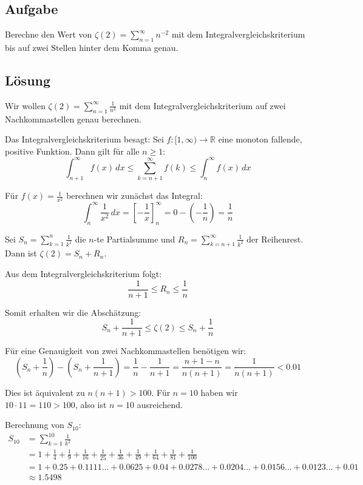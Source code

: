 \documentclass{article}
\begin{document}
\subsection*{Aufgabe}
Berechne den Wert von $\zeta(2)=\sum_{n=1}^\infty n^{-2}$ mit dem
Integralvergleichskriterium bis auf zwei Stellen hinter dem Komma genau.

\subsection*{Lösung}

Wir wollen $\zeta(2) = \sum_{n=1}^{\infty} \frac{1}{n^2}$ mit dem Integralvergleichskriterium auf zwei Nachkommastellen genau berechnen.

Das Integralvergleichskriterium besagt: Sei $f: [1,\infty) \to \mathbb{R}$ eine monoton fallende, positive Funktion. Dann gilt für alle $n \geq 1$:
\[
\int_{n+1}^{\infty} f(x) \, dx \leq \sum_{k=n+1}^{\infty} f(k) \leq \int_{n}^{\infty} f(x) \, dx
\]

Für $f(x) = \frac{1}{x^2}$ berechnen wir zunächst das Integral:
\[
\int_{n}^{\infty} \frac{1}{x^2} \, dx = \left[-\frac{1}{x}\right]_{n}^{\infty} = 0 - \left(-\frac{1}{n}\right) = \frac{1}{n}
\]

Sei $S_n = \sum_{k=1}^{n} \frac{1}{k^2}$ die $n$-te Partialsumme und $R_n = \sum_{k=n+1}^{\infty} \frac{1}{k^2}$ der Reihenrest. Dann ist $\zeta(2) = S_n + R_n$.

Aus dem Integralvergleichskriterium folgt:
\[
\frac{1}{n+1} \leq R_n \leq \frac{1}{n}
\]

Somit erhalten wir die Abschätzung:
\[
S_n + \frac{1}{n+1} \leq \zeta(2) \leq S_n + \frac{1}{n}
\]

Für eine Genauigkeit von zwei Nachkommastellen benötigen wir:
\[
\left(S_n + \frac{1}{n}\right) - \left(S_n + \frac{1}{n+1}\right) = \frac{1}{n} - \frac{1}{n+1} = \frac{n+1-n}{n(n+1)} = \frac{1}{n(n+1)} < 0.01
\]

Dies ist äquivalent zu $n(n+1) > 100$. Für $n = 10$ haben wir $10 \cdot 11 = 110 > 100$, also ist $n = 10$ ausreichend.

Berechnung von $S_{10}$:
\begin{align}
S_{10} &= \sum_{k=1}^{10} \frac{1}{k^2} \\
&= 1 + \frac{1}{4} + \frac{1}{9} + \frac{1}{16} + \frac{1}{25} + \frac{1}{36} + \frac{1}{49} + \frac{1}{64} + \frac{1}{81} + \frac{1}{100} \\
&= 1 + 0.25 + 0.1111... + 0.0625 + 0.04 + 0.0278... + 0.0204... + 0.0156... + 0.0123... + 0.01 \\
&\approx 1.5498
\end{align}
\end{document}
